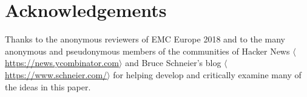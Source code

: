 \documentclass[conference]{IEEEtran}
\newcommand{\URL}[1]{$\langle$\url{#1}$\rangle$}
\begin{document}
\section*{Acknowledgements}

Thanks to the anonymous reviewers of EMC Europe 2018 and to the many
anonymous and pseudonymous members of the communities of Hacker News
\URL{https://news.ycombinator.com} and Bruce Schneier's blog
\URL{https://www.schneier.com/} for helping develop and critically examine
many of the ideas in this paper.






\end{document}
